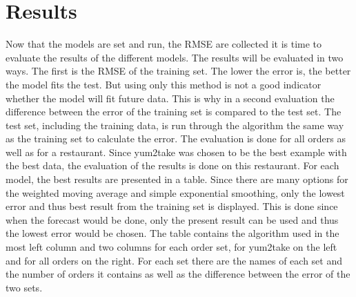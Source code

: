 \chapter{Results}\label{chapter:Results}
Now that the models are set and run, the RMSE are collected it is time to evaluate the results of the different models. The results will be evaluated in two ways. The first is the RMSE of the training set. The lower the error is, the better the model fits the test. But using only this method is not a good indicator whether the model will fit future data. This is why in a second evaluation the difference between the error of the training set is compared to the test set. The test set, including the training data, is run through the algorithm the same way as the training set to calculate the error.\newline
The evaluation is done for all orders as well as for a restaurant. Since yum2take was chosen to be the best example with the best data, the evaluation of the results is done on this restaurant.\newline
For each model, the best results are presented in a table. Since there are many options for the weighted moving average and simple exponential smoothing, only the lowest error and thus best result from the training set is displayed. This is done since when the forecast would be done, only the present result can be used and thus the lowest error would be chosen. The table contains the algorithm used in the most left column and two columns for each order set, for yum2take on the left and for all orders on the right. For each set there are the names of each set and the number of orders it contains as well as the difference between the error of the two sets.
